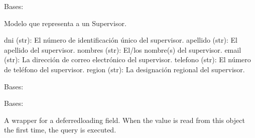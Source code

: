 \documentclass[letterpaper,10pt,spanish]{sphinxmanual}
\begin{document}
\begin{fulllineitems}

\pysigstartsignatures
{}
\pysigstopsignatures
\sphinxAtStartPar
Bases: 

\sphinxAtStartPar
Modelo que representa a un Supervisor.
\begin{description}
\sphinxAtStartPar
dni (str): El número de identificación único del supervisor.
apellido (str): El apellido del supervisor.
nombres (str): El/los nombre(s) del supervisor.
email (str): La dirección de correo electrónico del supervisor.
telefono (str): El número de teléfono del supervisor.
region (str): La designación regional del supervisor.

\end{description}


\begin{fulllineitems}

\pysigstartsignatures
{}
\pysigstopsignatures
\sphinxAtStartPar
Bases: 

\end{fulllineitems}



\begin{fulllineitems}

\pysigstartsignatures
{}
\pysigstopsignatures
\sphinxAtStartPar
Bases: 

\end{fulllineitems}



\begin{fulllineitems}

\pysigstartsignatures
{}
\pysigstopsignatures
\sphinxAtStartPar
A wrapper for a deferred\sphinxhyphen{}loading field. When the value is read from this
object the first time, the query is executed.


\end{fulllineitems}
\end{fulllineitems}
\end{document}
